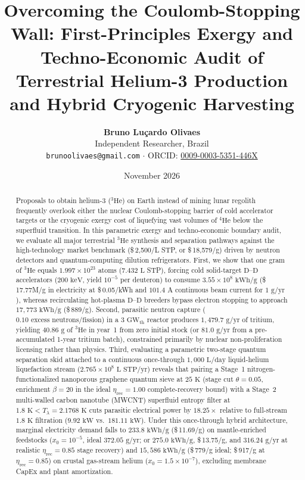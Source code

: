 \documentclass[11pt,a4paper]{article}
\title{\textbf{Overcoming the Coulomb-Stopping Wall: First-Principles Exergy and Techno-Economic Audit of Terrestrial Helium-3 Production and Hybrid Cryogenic Harvesting}}
\author{
    \textbf{Bruno Lu\c{c}ardo Olivaes}\\[0.2cm]
    \small Independent Researcher, Brazil\\
    \small \texttt{brunoolivaes@gmail.com} $\cdot$ ORCID: \href{https://orcid.org/0009-0003-5351-446X}{0009-0003-5351-446X}
}
\date{November 2026}
\begin{document}
\maketitle

\begin{abstract}
Proposals to obtain helium-3 ($^3\mathrm{He}$) on Earth instead of mining lunar regolith frequently overlook either the nuclear Coulomb-stopping barrier of cold accelerator targets or the cryogenic exergy cost of liquefying vast volumes of $^{4}\mathrm{He}$ below the superfluid transition. In this parametric exergy and techno-economic boundary audit, we evaluate all major terrestrial $^3\mathrm{He}$ synthesis and separation pathways against the high-technology market benchmark (\$\,2,500/L STP, or \$\,18,579/g) driven by neutron detectors and quantum-computing dilution refrigerators. First, we show that one gram of $^3\mathrm{He}$ equals $1.997 \times 10^{23}$ atoms ($7.432\text{ L}$ STP), forcing cold solid-target $\mathrm{D}\text{--}\mathrm{D}$ accelerators ($200\text{ keV}$, yield $10^{-5}$ per deuteron) to consume $3.55 \times 10^8\text{ kWh/g}$ (\$\,17.77M/g in electricity at \$\,0.05/kWh and $101.4\text{ A}$ continuous beam current for $1\text{ g/yr}$), whereas recirculating hot-plasma $\mathrm{D}\text{--}\mathrm{D}$ breeders bypass electron stopping to approach $17{,}773\text{ kWh/g}$ (\$\,889/g). Second, parasitic neutron capture ($0.10\text{ excess neutrons/fission}$) in a $3\text{ GW}_{\mathrm{th}}$ reactor produces $1{,}479.7\text{ g/yr}$ of tritium, yielding $40.86\text{ g}$ of $^3\mathrm{He}$ in year~1 from zero initial stock (or $81.0\text{ g/yr}$ from a pre-accumulated 1-year tritium batch), constrained primarily by nuclear non-proliferation licensing rather than physics. Third, evaluating a parametric two-stage quantum separation skid attached to a continuous once-through $1{,}000\text{ L/day}$ liquid-helium liquefaction stream ($2.765 \times 10^8\text{ L STP/yr}$) reveals that pairing a Stage~1 nitrogen-functionalized nanoporous graphene quantum sieve at $25\text{ K}$ (stage cut $\theta = 0.05$, enrichment $\beta = 20$ in the ideal $\eta_{\mathrm{rec}}=1.00$ complete-recovery bound) with a Stage~2 multi-walled carbon nanotube (MWCNT) superfluid entropy filter at $1.8\text{ K} < T_\lambda = 2.1768\text{ K}$ cuts parasitic electrical power by $18.25\times$ relative to full-stream $1.8\text{ K}$ filtration ($9.92\text{ kW}$ vs.\ $181.11\text{ kW}$). Under this once-through hybrid architecture, marginal electricity demand falls to $233.8\text{ kWh/g}$ (\$\,11.69/g) on mantle-enriched feedstocks ($x_0 = 10^{-5}$, ideal $372.05\text{ g/yr}$; or $275.0\text{ kWh/g}$, \$\,13.75/g, and $316.24\text{ g/yr}$ at realistic $\eta_{\mathrm{rec}} = 0.85$ stage recovery) and $15{,}586\text{ kWh/g}$ (\$\,779/g ideal; \$\,917/g at $\eta_{\mathrm{rec}}=0.85$) on crustal gas-stream helium ($x_0 = 1.5\times 10^{-7}$), excluding membrane CapEx and plant amortization.
\end{abstract}
\end{document}
